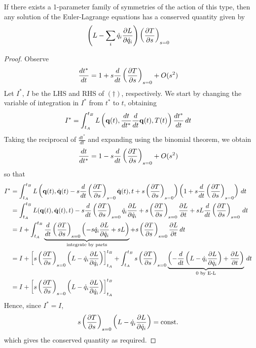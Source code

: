 \documentclass{../../template/note}
\begin{document}
    \begin{theorem}
        If there exists a 1-parameter family of symmetries of the action of this type, then any solution of the Euler-Lagrange equations has a conserved quantity given by
        \begin{align*}
            \left(L - \sum_i \dot q_i \pd{L}{\dot q_i}\right) \left(\pd{T}{s}\right)_{s=0}
        \end{align*}    
    \end{theorem}
    
    \begin{proof}
        Observe
        \begin{align*}
            \frac{dt^*}{dt} = 1 + s \frac{d}{dt} \left(\pd{T}{s}\right)_{s=0} + O(s^2)
        \end{align*}
        Let $I^*$, $I$ be the LHS and RHS of $(\dagger)$, respectively. We start by changing the variable of integration in $I^*$ from $t^*$ to $t$, obtaining
        \begin{align*}
            I^* = \int_{t_A}^{t_B} L\left(\V q(t), \frac{dt}{dt^*}\frac{d}{dt} \V q(t), T(t)\right) \frac{dt^*}{dt} \D t 
        \end{align*}
        Taking the reciprocal of $\frac{dt^*}{dt}$ and expanding using the binomial theorem, we obtain
        \begin{align*}
            \frac{dt}{dt^*} = 1 - s \frac{d}{dt} \left(\pd{T}{s}\right)_{s=0} + O(s^2)
        \end{align*}
        so that
        \begin{align*}
            I^* &= \int_{t_A}^{t_B} L\left(\V q(t), \dot{\V q}(t) - s \frac{d}{dt} \left(\pd{T}{s}\right)_{s=0} \dot{\V q}(t), t + s\left(\pd{T}{s}\right)_{s=0}\right) \left(1 + s \frac{d}{dt} \left(\pd{T}{s}\right)_{s=0}\right) \D t \\
            &= \int_{t_A}^{t_B} L(\V q(t), \dot{\V q}(t), t) - s \frac{d}{dt} \left(\pd{T}{s}\right)_{s=0} \dot q_i \pd{L}{\dot q_i} + s \left(\pd{T}{s}\right)_{s=0} \pd{L}{t} + sL \frac{d}{dt} \left(\pd{T}{s}\right)_{s=0} \D t \\
            &= I + \int_{t_A}^{t_B} \underbrace{\frac{d}{dt} \left(\pd{T}{s}\right)_{s=0} \left(-s \dot q_i \pd{L}{\dot q_i} + sL\right)}_{\text{integrate by parts}} + s\left(\pd{T}{s}\right)_{s=0} \pd{L}{t} \D t \\
            &= I + \left[s\left(\pd{T}{s}\right)_{s=0}\left(L - \dot q_i \pd{L}{\dot q_i}\right)\right]_{t_A}^{t_B} + \int_{t_A}^{t_B} s \left(\pd{T}{s}\right)_{s=0} \underbrace{\left(-\frac{d}{dt} \left(L - \dot q_i \pd{L}{\dot q_i}\right) + \pd{L}{t}\right)}_{0 \text{ by E-L}} \D t \\
            &= I + \left[s\left(\pd{T}{s}\right)_{s=0}\left(L - \dot q_i \pd{L}{\dot q_i}\right)\right]_{t_A}^{t_B}
        \end{align*}
        Hence, since $I^* = I$,
        \begin{align*}
            s\left(\pd{T}{s}\right)_{s=0}\left(L - \dot q_i \pd{L}{\dot q_i}\right) = \text{const.}
        \end{align*}
        which gives the conserved quantity as required.
    \end{proof}
    
\end{document}
